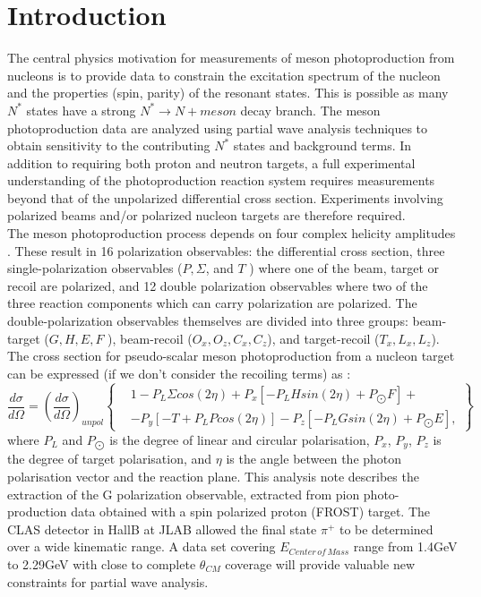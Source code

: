 \section{Introduction}
The central physics motivation for measurements of meson photoproduction from nucleons is to provide data to constrain the excitation spectrum of the nucleon and the properties (spin, parity) of the resonant states.  This is possible as many $N^*$ states have a strong $N^*\rightarrow N + meson$  decay branch.  The meson photoproduction data are analyzed using partial wave analysis techniques to obtain sensitivity to the contributing $N^*$ states and background terms.
In addition to requiring both proton and neutron targets, a full experimental understanding of the photoproduction reaction system requires measurements
beyond that of the unpolarized differential cross section. Experiments involving polarized beams and/or polarized nucleon targets are therefore required. \\
The meson photoproduction process depends on four complex helicity amplitudes \cite{PhysRev.106.1337} \cite{PhysRev.106.1345}. These result in 16 polarization observables: the differential cross section, three single-polarization observables ($P, \Sigma$, and $T$ ) where one of the beam, target
or recoil are polarized, and 12 double polarization observables where two of the three reaction components which can carry polarization are polarized. The
double-polarization observables themselves are divided into three groups: beam-target ($G, H, E, F$ ), beam-recoil ($O_x , O_z, C_x , C_z$), and target-recoil ($T_x , L_x , L_z$).
The cross section for pseudo-scalar meson photoproduction from a nucleon target can be expressed (if we don't consider the recoiling terms) as \cite{Bark_1974}:
\begin{equation}
\frac{d\sigma}{d\Omega} = \left(\frac{d\sigma}{d\Omega} \right)_{unpol}  \left\{ 
\begin{aligned}
    & 1 - P_L \Sigma cos(2\eta) + P_x \left[-P_L H sin(2\eta) + P_{\bigodot}F\right] + \\
& -P_y \left[ -T +P_L P cos(2\eta)\right] -P_z \left[-P_L G sin(2\eta) + P_{\bigodot}E\right],
\end{aligned}
\right\} 
\label{eqn:CGLN}
\end{equation}
where $P_L$ and $P_{\bigodot}$ is the degree of linear and circular polarisation, $P_x$, $P_y$, $P_z$ is the degree of target polarisation, and $\eta$ is the angle between the photon polarisation vector and the reaction plane.  
This analysis note describes the extraction of the G polarization observable, extracted from pion photo-production data obtained with a spin polarized proton (FROST) target. The CLAS detector in HallB at JLAB allowed the final state $\pi^+$ to be determined over a wide kinematic range. A data set covering $E_{Center\, of\, Mass}$ range from 1.4GeV to 2.29GeV with close to complete $\theta_{CM}$ coverage will provide valuable new constraints for partial wave analysis.
